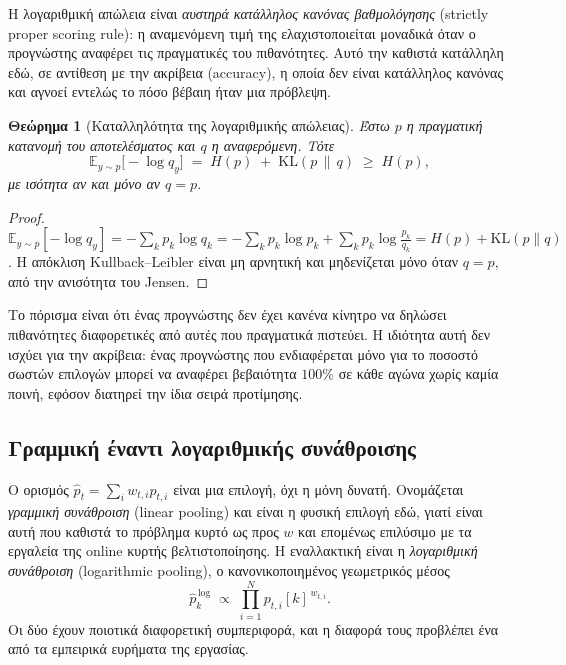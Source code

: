 \documentclass[12pt,a4paper,oneside]{report}
\newcommand{\en}[1]{\textenglish{#1}}
\renewcommand{\_}{\oldunderscore\allowbreak}
\theoremstyle{definition}
\theoremstyle{plain}
\newtheorem{theorem}{Θεώρημα}[chapter]
\theoremstyle{remark}
\begin{document}
Η λογαριθμική απώλεια είναι \emph{αυστηρά κατάλληλος κανόνας βαθμολόγησης} (\en{strictly
proper scoring rule}): η αναμενόμενη τιμή της ελαχιστοποιείται μοναδικά όταν ο προγνώστης
αναφέρει τις πραγματικές του πιθανότητες. Αυτό την καθιστά κατάλληλη εδώ, σε αντίθεση με την
ακρίβεια (\en{accuracy}), η οποία δεν είναι κατάλληλος κανόνας και αγνοεί εντελώς το πόσο
βέβαιη ήταν μια πρόβλεψη.

\begin{theorem}[Καταλληλότητα της λογαριθμικής απώλειας]
Έστω $p$ η πραγματική κατανομή του αποτελέσματος και $q$ η αναφερόμενη. Τότε
\[
\mathbb{E}_{y\sim p}\big[-\log q_y\big] \;=\; H(p) \;+\; \mathrm{KL}(p \,\|\, q) \;\geq\; H(p),
\]
με ισότητα αν και μόνο αν $q = p$.
\end{theorem}

\begin{proof}
$\mathbb{E}_{y\sim p}[-\log q_y] = -\sum_k p_k \log q_k
= -\sum_k p_k \log p_k + \sum_k p_k \log \frac{p_k}{q_k} = H(p) + \mathrm{KL}(p\|q)$.
Η απόκλιση Kullback--Leibler είναι μη αρνητική και μηδενίζεται μόνο όταν $q=p$, από την
ανισότητα του Jensen.
\end{proof}

Το πόρισμα είναι ότι ένας προγνώστης δεν έχει κανένα κίνητρο να δηλώσει πιθανότητες
διαφορετικές από αυτές που πραγματικά πιστεύει. Η ιδιότητα αυτή δεν ισχύει για την ακρίβεια:
ένας προγνώστης που ενδιαφέρεται μόνο για το ποσοστό σωστών επιλογών μπορεί να αναφέρει
βεβαιότητα $100\%$ σε κάθε αγώνα χωρίς καμία ποινή, εφόσον διατηρεί την ίδια σειρά
προτίμησης.

\subsection*{Γραμμική έναντι λογαριθμικής συνάθροισης}
\label{sec:pooling}

Ο ορισμός $\hat{p}_t = \sum_i w_{t,i} p_{t,i}$ είναι μια επιλογή, όχι η μόνη δυνατή. Ονομάζεται
\emph{γραμμική συνάθροιση} (\en{linear pooling}) και είναι η φυσική επιλογή εδώ, γιατί είναι
αυτή που καθιστά το πρόβλημα κυρτό ως προς $w$ και επομένως επιλύσιμο με τα εργαλεία της
online κυρτής βελτιστοποίησης. Η εναλλακτική είναι η \emph{λογαριθμική συνάθροιση}
(\en{logarithmic pooling}), ο κανονικοποιημένος γεωμετρικός μέσος
\[
\hat{p}^{\,\mathrm{log}}_k \;\propto\; \prod_{i=1}^{N} p_{t,i}[k]^{\,w_{t,i}} .
\]
Οι δύο έχουν ποιοτικά διαφορετική συμπεριφορά, και η διαφορά τους προβλέπει ένα από τα
εμπειρικά ευρήματα της εργασίας.
\end{document}
